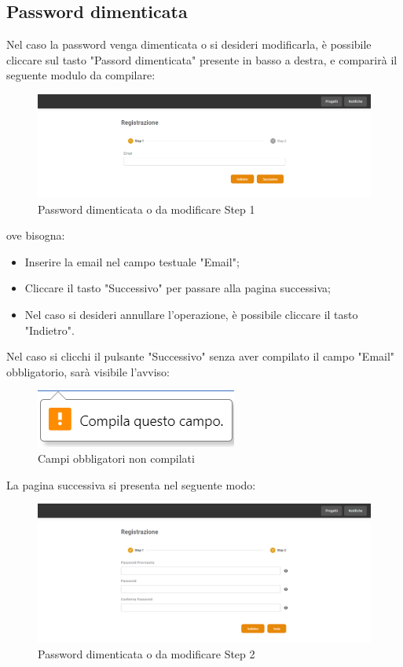 \documentclass{article}
\begin{document}
\subsection{Password dimenticata}
Nel caso la password venga dimenticata o si desideri modificarla, è possibile cliccare sul tasto "Passord dimenticata" presente in basso a destra, e comparirà il seguente modulo da compilare:
 \begin{figure}[H]
      \centering
      \includegraphics[width=\textwidth]{documenti/Screenshot manuale utente/cambio password step1.png}
      \caption{Password dimenticata o da modificare Step 1}
      \label{step1}
    \end{figure} 
ove bisogna:
\begin{itemize}
    \item Inserire la email nel campo testuale "Email";
    \item Cliccare il tasto "Successivo" per passare alla pagina successiva;
    \item Nel caso si desideri annullare l'operazione, è possibile cliccare il tasto "Indietro".
\end{itemize}
Nel caso si clicchi il pulsante "Successivo" senza aver compilato il campo "Email" obbligatorio, sarà visibile l'avviso:
\begin{figure}[H]
      \centering
      \includegraphics{documenti/Screenshot manuale utente/compila questo campo.png}
      \caption{Campi obbligatori non compilati}
      \label{campiobb}
    \end{figure}
La pagina successiva si presenta nel seguente modo:
\begin{figure}[H]
      \centering
      \includegraphics[width=\textwidth]{documenti/Screenshot manuale utente/cambio password step 2.png}
      \caption{Password dimenticata o da modificare Step 2}
      \label{step2}
    \end{figure} 
\end{document}

